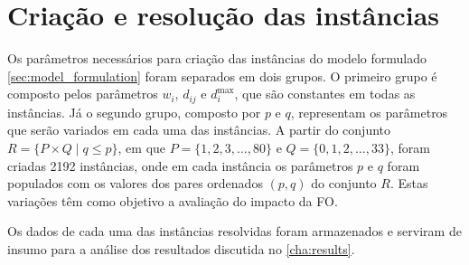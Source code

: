 \section{Criação e resolução das instâncias} \label{sec:instances}

Os parâmetros necessários para criação das instâncias do modelo formulado \autoref{sec:model_formulation} foram separados em dois grupos. O primeiro grupo é composto pelos parâmetros $w_i$, $d_{ij}$ e $d_i^{\text{max}}$, que são constantes em todas as instâncias. Já o segundo grupo, composto por $p$ e $q$, representam os parâmetros que serão variados em cada uma das instâncias. A partir do conjunto $R = \{P \times Q \mid q \leq p\}$, em que $P = \{1,2,3,\ldots,80\}$ e $Q = \{0,1,2,\ldots,33\}$, foram criadas 2192 instâncias, onde em cada instância os parâmetros $p$ e $q$ foram populados com os valores dos pares ordenados $(p,q)$ do conjunto $R$. Estas variações têm como objetivo a avaliação do impacto da FO.

Os dados de cada uma das instâncias resolvidas foram armazenados e serviram de insumo para a análise dos resultados discutida no \autoref{cha:results}.
